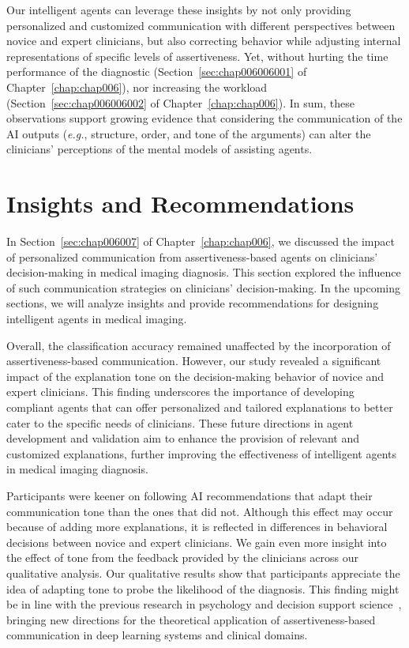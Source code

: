 Our intelligent agents can leverage these insights by not only providing personalized and customized communication with different perspectives between novice and expert clinicians, but also correcting behavior while adjusting internal representations of specific levels of assertiveness. Yet, without hurting the time performance of the diagnostic (Section~\ref{sec:chap006006001} of Chapter~\ref{chap:chap006}), nor increasing the workload (Section~\ref{sec:chap006006002} of Chapter~\ref{chap:chap006}).
In sum, these observations support growing evidence that considering the communication of the \ac{AI} outputs ({\it e.g.}, structure, order, and tone of the arguments) can alter the clinicians' perceptions of the mental models of assisting agents.

\section{Insights and Recommendations}
\label{sec:app005008}

In Section~\ref{sec:chap006007} of Chapter~\ref{chap:chap006}, we discussed the impact of personalized communication from assertiveness-based agents on clinicians' decision-making in medical imaging diagnosis.
This section explored the influence of such communication strategies on clinicians' decision-making.
In the upcoming sections, we will analyze insights and provide recommendations for designing intelligent agents in medical imaging.

Overall, the classification accuracy remained unaffected by the incorporation of assertiveness-based communication.
However, our study revealed a significant impact of the explanation tone on the decision-making behavior of novice and expert clinicians.
This finding underscores the importance of developing compliant agents that can offer personalized and tailored explanations to better cater to the specific needs of clinicians.
These future directions in agent development and validation aim to enhance the provision of relevant and customized explanations, further improving the effectiveness of intelligent agents in medical imaging diagnosis.

Participants were keener on following \ac{AI} recommendations that adapt their communication tone than the ones that did not.
Although this effect may occur because of adding more explanations, it is reflected in differences in behavioral decisions between novice and expert clinicians.
We gain even more insight into the effect of tone from the feedback provided by the clinicians across our qualitative analysis.
Our qualitative results show that participants appreciate the idea of adapting tone to probe the likelihood of the diagnosis.
This finding might be in line with the previous research in psychology and decision support science~\cite{Seidel2021}, bringing new directions for the theoretical application of assertiveness-based communication in deep learning systems and clinical domains.

